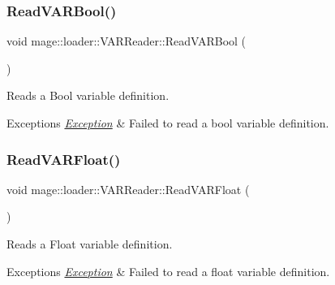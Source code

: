 \subsubsection{\texorpdfstring{Read\+V\+A\+R\+Bool()}{ReadVARBool()}}
{\footnotesize\ttfamily void mage\+::loader\+::\+V\+A\+R\+Reader\+::\+Read\+V\+A\+R\+Bool (\begin{DoxyParamCaption}{ }\end{DoxyParamCaption})\hspace{0.3cm}{\ttfamily [private]}}

Reads a Bool variable definition.


\begin{DoxyExceptions}{Exceptions}
{\em \hyperlink{classmage_1_1_exception}{Exception}} & Failed to read a bool variable definition. \\
\hline
\end{DoxyExceptions}
\hypertarget{classmage_1_1loader_1_1_v_a_r_reader_a11f2ecdf718d1665a79406e7bebbc6f1}{}\label{classmage_1_1loader_1_1_v_a_r_reader_a11f2ecdf718d1665a79406e7bebbc6f1} 
\subsubsection{\texorpdfstring{Read\+V\+A\+R\+Float()}{ReadVARFloat()}}
{\footnotesize\ttfamily void mage\+::loader\+::\+V\+A\+R\+Reader\+::\+Read\+V\+A\+R\+Float (\begin{DoxyParamCaption}{ }\end{DoxyParamCaption})\hspace{0.3cm}{\ttfamily [private]}}

Reads a Float variable definition.


\begin{DoxyExceptions}{Exceptions}
{\em \hyperlink{classmage_1_1_exception}{Exception}} & Failed to read a float variable definition. \\
\hline
\end{DoxyExceptions}
\hypertarget{classmage_1_1loader_1_1_v_a_r_reader_ac80f8a30ffc67fc6f048cf32dd43c2e8}{}\label{classmage_1_1loader_1_1_v_a_r_reader_ac80f8a30ffc67fc6f048cf32dd43c2e8} 
